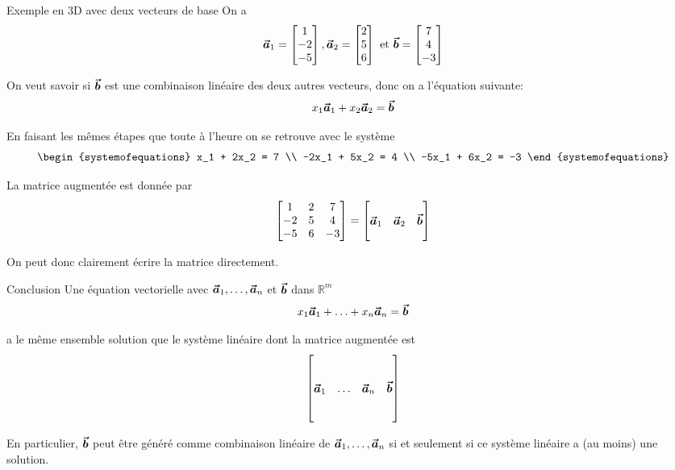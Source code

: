 \documentclass{article}
\begin{document}
\begin{parag}{Exemple en 3D avec deux vecteurs de base}
    On a
    \[\bm{\protect\vec{a}}_1 = \begin{bmatrix} 1 \\ -2 \\ -5 \end{bmatrix}, \bm{\protect\vec{a}}_2 = \begin{bmatrix} 2 \\ 5 \\ 6 \end{bmatrix} \text{ et } \bm{\protect\vec{b}} = \begin{bmatrix} 7 \\ 4 \\ -3 \end{bmatrix} \]

    On veut savoir si $\bm{\protect\vec{b}}$ est une combinaison linéaire des deux autres vecteurs, donc on a l'équation suivante:
    \[x_1 \bm{\protect\vec{a}}_1 + x_2 \bm{\protect\vec{a}}_2 = \bm{\protect\vec{b}}\]

    En faisant les mêmes étapes que toute à l'heure on se retrouve avec le système
    \[\begin{systemofequations}
    x_1 + 2x_2 = 7 \\
    -2x_1 + 5x_2 = 4 \\
    -5x_1 + 6x_2 = -3
    \end{systemofequations}\]

    La matrice augmentée est donnée par
    \[\begin{bmatrix} 1 & 2 & 7 \\ -2 & 5 & 4 \\ -5 & 6 & -3 \end{bmatrix} = \begin{bmatrix}  &  &  \\ \bm{\protect\vec{a}}_1 & \bm{\protect\vec{a}}_2 & \bm{\protect\vec{b}} \\  &  &  \end{bmatrix} \]

    On peut donc clairement écrire la matrice directement.
\end{parag}

\begin{parag}{Conclusion}
    Une équation vectorielle avec $\bm{\protect\vec{a}}_1, \ldots, \bm{\protect\vec{a}}_n$ et $\bm{\protect\vec{b}}$ dans $\mathbb{R}^m$
    \[x_1 \bm{\protect\vec{a}}_1 + \ldots + x_n \bm{\protect\vec{a}}_n = \bm{\protect\vec{b}}\]

    a le même ensemble solution que le système linéaire dont la matrice augmentée est
    \[\begin{bmatrix}  &  &  &  \\ &  &  &  \\ \bm{\protect\vec{a}}_1 & \ldots & \bm{\protect\vec{a}}_n & \bm{\protect\vec{b}} \\  &  &  &  \\  &  &  &  \end{bmatrix} \]

    En particulier, $\bm{\protect\vec{b}}$ peut être généré comme combinaison linéaire de $\bm{\protect\vec{a}}_1, \ldots, \bm{\protect\vec{a}}_n$ si et seulement si ce système linéaire a (au moins) une solution.
\end{parag}
\end{document}
